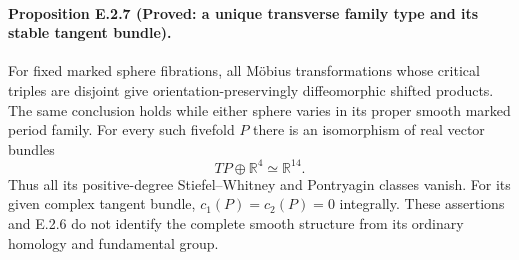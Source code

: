 \paragraph{Proposition E.2.7 (Proved: a unique transverse family type and its stable tangent bundle).}
For fixed marked sphere fibrations, all M\"obius transformations
whose critical triples are disjoint give orientation-preservingly
diffeomorphic shifted products. The same conclusion holds while
either sphere varies in its proper smooth marked period family.
For every such fivefold $P$ there is an isomorphism of real vector
bundles
\[
 TP\oplus\mathbb R^4\simeq\mathbb R^{14}.
 \tag{E.MV9}
\]
Thus all its positive-degree Stiefel--Whitney and Pontryagin
classes vanish. For its given complex tangent bundle,
$c_1(P)=c_2(P)=0$ integrally.
These assertions and E.2.6 do not identify the complete smooth
structure from its ordinary homology and fundamental group.
